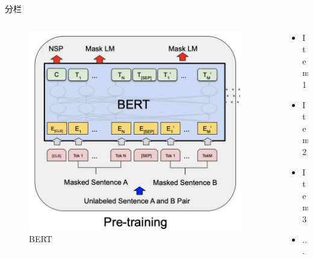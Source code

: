\documentclass[hyperref,UTF8,11pt]{beamer}
\begin{document}
\begin{frame}{分栏}
    \begin{columns}
        \begin{column}{0.5\textwidth}
            \begin{figure}
                \centering
                \includegraphics[width=0.95\textwidth]{BERT.png}
                \caption{BERT}\label{fig:bert2}
            \end{figure}
        \end{column}
        \begin{column}{0.5\textwidth}
            \begin{itemize}
                \item Item1
                \item Item2
                \item Item3
                \item ...
            \end{itemize}
        \end{column}
    \end{columns}
\end{frame}
\end{document}
